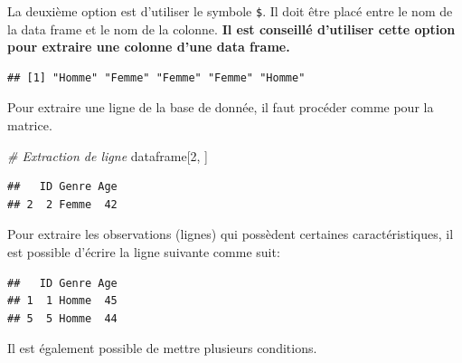 \documentclass[
]{book}
\newenvironment{Shaded}{\begin{snugshade}}{\end{snugshade}}
\newcommand{\CommentTok}[1]{\textcolor[rgb]{0.56,0.35,0.01}{\textit{#1}}}
\newcommand{\DecValTok}[1]{\textcolor[rgb]{0.00,0.00,0.81}{#1}}
\newcommand{\NormalTok}[1]{#1}
\newcommand{\SpecialCharTok}[1]{\textcolor[rgb]{0.81,0.36,0.00}{\textbf{#1}}}
\newcommand{\StringTok}[1]{\textcolor[rgb]{0.31,0.60,0.02}{#1}}
\begin{document}
La deuxième option est d'utiliser le symbole \texttt{\$}. Il doit être placé entre le nom de la data frame et le nom de la colonne.
\textbf{Il est conseillé d'utiliser cette option pour extraire une colonne d'une data frame.}

\begin{Shaded}
\end{Shaded}

\begin{verbatim}
## [1] "Homme" "Femme" "Femme" "Femme" "Homme"
\end{verbatim}

Pour extraire une ligne de la base de donnée, il faut procéder comme pour la matrice.

\begin{Shaded}
\begin{Highlighting}[]
\CommentTok{\# Extraction de ligne}
\NormalTok{dataframe[}\DecValTok{2}\NormalTok{, ]}
\end{Highlighting}
\end{Shaded}

\begin{verbatim}
##   ID Genre Age
## 2  2 Femme  42
\end{verbatim}

Pour extraire les observations (lignes) qui possèdent certaines caractéristiques, il est possible d'écrire la ligne suivante comme suit:

\begin{Shaded}
\end{Shaded}

\begin{verbatim}
##   ID Genre Age
## 1  1 Homme  45
## 5  5 Homme  44
\end{verbatim}

Il est également possible de mettre plusieurs conditions.

\begin{Shaded}
\end{Shaded}
\end{document}
